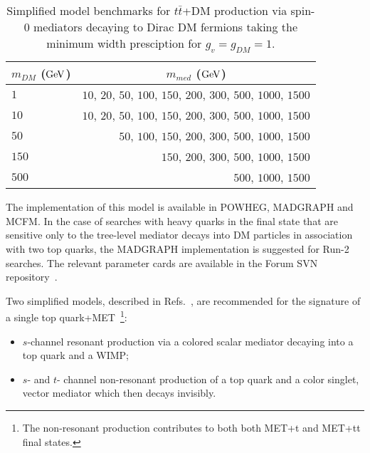 \documentclass[a4,debug,notitlepage,nobib]{tufte-handout}
\newif\ifATLAS
\newif\ifCMS
\begin{document}
\begin{table}[!ht]
\centering
\begin{tabular}{| l | r |}
\hline
\multicolumn{1}{|c|}{$m_{DM}$ (${\rm GeV}$)} & \multicolumn{1}{c|}{$m_{med}$ (${\rm GeV}$)} \\
\hline
 $1$    & $10$, $20$, $50$, $100$, $150$, $200$, $300$, $500$, $1000$, $1500$  \\
 $10$   & $10$, $20$, $50$, $100$, $150$, $200$, $300$, $500$, $1000$, $1500$  \\
 $50$   &             $50$, $100$, $150$, $200$, $300$, $500$, $1000$, $1500$  \\
 $150$  &                          $150$, $200$, $300$, $500$, $1000$, $1500$  \\
 $500$  &                                               $500$, $1000$, $1500$  \\
\hline
\end{tabular}
\caption{Simplified model benchmarks for $t\bar{t}$+DM production via spin-0 mediators decaying to Dirac DM fermions taking the minimum width presciption for $g_v = g_{DM} = 1$.}
\label{tab:ttdm_benchmarks}
\end{table}

The implementation of this model is available in POWHEG, MADGRAPH
and MCFM. In the case of searches with heavy quarks in the final state
that are sensitive only to the tree-level mediator decays into DM particles
in association with two top quarks, the MADGRAPH implementation is suggested
for Run-2 searches. The relevant parameter cards are available in the Forum 
SVN repository~\cite{ForumSVN_DMTTBar}.


\ifATLAS 
The ATLAS implementation of this model using on-the-fly Madgraph
will follow the MC15 pilot request for the monophoton D5 operator~\cite{ATLAS_PowhegPythiaMC15Test}. 
\fi

\ifCMS
\textbf{[Open point: Add here implementation details for CMS..]}
\fi


Two simplified models, described in Refs.~\cite{Andrea:2011ws,Boucheneb:2014wza}, are recommended 
for the signature of a single top quark+MET~\footnote{The non-resonant production 
contributes to both both MET+t and MET+tt final states.}:

\begin{itemize}
\item $s$-channel resonant production via a colored scalar mediator decaying into a top quark and a WIMP;
\item $s$- and $t$- channel non-resonant production of a top quark and a color singlet, vector mediator which then decays invisibly.
\end{itemize}
\end{document}

